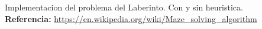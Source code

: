 Implementacion del problema del Laberinto. Con y sin heuristica. \\ \textbf{Referencia:} \url{https://en.wikipedia.org/wiki/Maze_solving_algorithm}